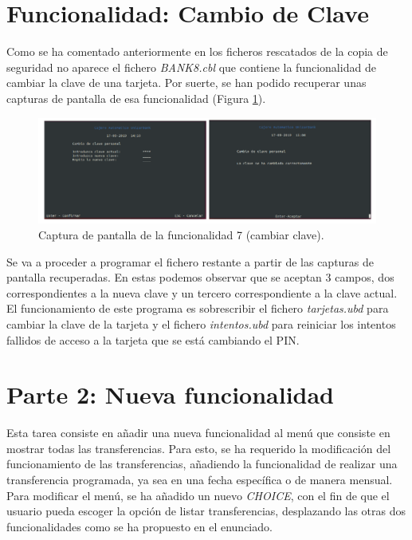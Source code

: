 \documentclass[10pt,a4paper]{article}
\begin{document}
\section{Funcionalidad: Cambio de Clave}
\label{section:cambio_de_clave}

Como se ha comentado anteriormente en los ficheros rescatados de la copia de seguridad no aparece el fichero \emph{BANK8.cbl} que contiene la funcionalidad de cambiar la clave de una tarjeta. Por suerte, se han podido recuperar unas capturas de pantalla de esa funcionalidad (Figura \ref{fig:captura_funcion_7}).

\begin{figure}[h!]
\centering
\includegraphics[scale=0.75]{images/funcionalidad7.png}
\caption{Captura de pantalla de la funcionalidad 7 (cambiar clave).}
\label{fig:captura_funcion_7}
\end{figure}

Se va a proceder a programar el fichero restante a partir de las capturas de pantalla recuperadas. En estas podemos observar que se aceptan 3 campos, dos correspondientes a la nueva clave y un tercero correspondiente a la clave actual. \\
El funcionamiento de este programa es sobrescribir el fichero \emph{tarjetas.ubd} para cambiar la clave de la tarjeta y el fichero \emph{intentos.ubd} para reiniciar los intentos fallidos de acceso a la tarjeta que se está cambiando el PIN.

\section{Parte 2: Nueva funcionalidad}

Esta tarea consiste en añadir una nueva funcionalidad al menú que consiste en mostrar todas las transferencias. Para esto, se ha requerido la modificación del funcionamiento de las transferencias, añadiendo la funcionalidad de realizar una transferencia programada, ya sea en una fecha específica o de manera mensual.\\
Para modificar el menú, se ha añadido un nuevo \emph{CHOICE}, con el fin de que el usuario pueda escoger la opción de listar transferencias, desplazando las otras dos funcionalidades como se ha propuesto en el enunciado.
\end{document}

